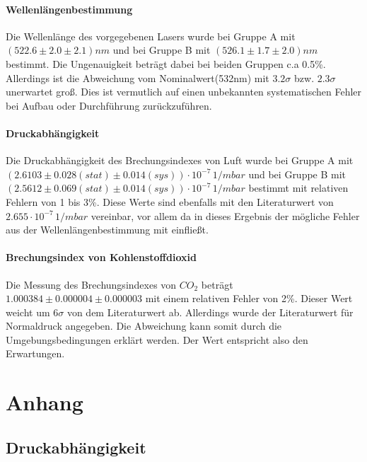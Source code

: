 \documentclass[12pt,a4paper]{article}
\begin{document}
\paragraph{Wellenlängenbestimmung}
Die Wellenlänge des vorgegebenen Lasers wurde bei Gruppe A mit $(522.6\pm 2.0 \pm 2.1) nm$ und bei Gruppe B mit $(526.1\pm 1.7\pm 2.0)nm$ bestimmt. Die Ungenauigkeit beträgt dabei bei beiden Gruppen c.a 0.5\%. Allerdings ist die Abweichung vom Nominalwert(532nm)
mit $3.2\sigma$ bzw. $2.3\sigma$ unerwartet groß. Dies ist vermutlich auf einen unbekannten systematischen Fehler bei Aufbau oder Durchführung zurückzuführen.
\paragraph{Druckabhängigkeit}
Die Druckabhängigkeit des Brechungsindexes von Luft wurde bei Gruppe A mit $(2.6103 \pm 0.028 (stat) \pm 0.014 (sys)) \cdot 10^{-7} \, \si{1/mbar}$ und bei Gruppe B mit $(2.5612 \pm 0.069 (stat) \pm 0.014 (sys)) \cdot 10^{-7} \, \si{1/mbar}$ bestimmt mit relativen Fehlern von 1 bis 3\%. Diese Werte sind ebenfalls mit den Literaturwert von $2.655\cdot 10^{-7} \, \si{1/mbar}$ vereinbar, vor allem da in dieses Ergebnis der mögliche Fehler aus der Wellenlängenbestimmung mit einfließt. 
\paragraph{Brechungsindex von Kohlenstoffdioxid}
Die Messung des Brechungsindexes von $CO_2$ beträgt $1.000384\pm 0.000004 \pm 0.000003$ mit einem relativen Fehler von 2\%. Dieser Wert weicht um $6\sigma$ von dem Literaturwert ab. Allerdings wurde der Literaturwert für Normaldruck angegeben. Die Abweichung kann somit durch die Umgebungsbedingungen erklärt werden. Der Wert entspricht also den Erwartungen.

\section{Anhang}

\subsection{Druckabhängigkeit}
\end{document}

